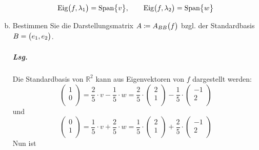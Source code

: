\documentclass{scrreprt}
\begin{document}
\begin{enumerate}[(a)]
  \[
    \text{Eig}\qty\big(f, \lambda_1) = \text{Span}\qty\big{v}, \qquad
    \text{Eig}\qty\big(f, \lambda_2) = \text{Span}\qty\big{w}
  \]

\newpage
\item Bestimmen Sie die Darstellungsmatrix $A \coloneqq A_{BB}\qty\big(f)$ bzgl.
  der Standardbasis $B = \qty\big(e_1, e_2)$.

  \subparagraph{Lsg.} Die Standardbasis von $\mathbb{R}^2$ kann aus Eigenvektoren
  von $f$ dargestellt werden:
  \[
    \begin{pmatrix}
      1 \\
      0 \\
    \end{pmatrix} = \frac{2}{5} \cdot v - \frac{1}{5} \cdot w =
    \frac{2}{5} \cdot \begin{pmatrix}
      2 \\
      1 \\
    \end{pmatrix} - \frac{1}{5} \cdot \begin{pmatrix}
      -1 \\
      2 \\
    \end{pmatrix}
  \]
  und
  \[
    \begin{pmatrix}
      0 \\
      1 \\
    \end{pmatrix} = \frac{1}{5} \cdot v + \frac{2}{5} \cdot w =
    \frac{1}{5} \cdot \begin{pmatrix}
      2 \\
      1 \\
    \end{pmatrix} + \frac{2}{5} \cdot \begin{pmatrix}
      -1 \\
      2 \\
    \end{pmatrix}
  \]
  Nun ist
\end{enumerate}
\end{document}
